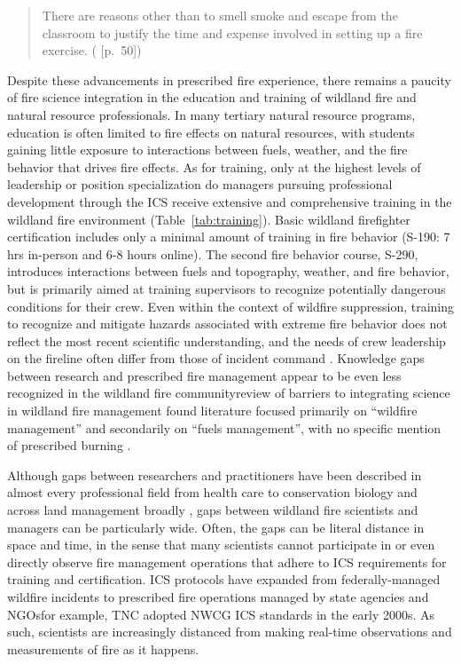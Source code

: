 \documentclass[fire,casereport,accept,moreauthors,pdftex]{Definitions/mdpi}  %
\begin{document}
\begin{quote}
There are reasons other than to smell smoke and escape from the classroom to justify the time and expense involved in setting up a fire exercise. (\cite{andrews1989} [p.~50])
\end{quote}

Despite these advancements in prescribed fire experience, there remains a paucity of fire science integration in the education and training of wildland fire and natural resource professionals.
In many tertiary natural resource programs, education is often limited to fire effects on natural resources, with students gaining little exposure to interactions between fuels, weather, and the fire behavior that drives fire effects.
As for training, only at the highest levels of leadership or position specialization do managers pursuing professional development through the ICS receive extensive and comprehensive training in the wildland fire environment (Table~\ref{tab:training}).
Basic wildland firefighter certification includes only a minimal amount of training in fire behavior (S-190: 7 hrs in-person and 6-8 hours online).
The second fire behavior course, S-290, introduces interactions between fuels and topography, weather, and fire behavior, but is primarily aimed at training supervisors to recognize potentially dangerous conditions for their crew.
Even within the context of wildfire suppression, training to recognize and mitigate hazards associated with extreme fire behavior does not reflect the most recent scientific understanding, and the needs of crew leadership on the fireline often differ from those of incident command \citep{werth2016}.
Knowledge gaps between research and prescribed fire management appear to be even less recognized in the wildland fire community\textemdash review of barriers to integrating  science in wildland fire management found literature focused primarily on ``wildfire management'' and secondarily on ``fuels management'', with no specific mention of prescribed burning \citep{hunter2020}.

Although gaps between researchers and practitioners have been described in almost every professional field from health care to conservation biology \citep{stott2012, prendergast1999} and across land management broadly \citep{carter2020}, gaps between wildland fire scientists and managers can be particularly wide.
Often, the gaps can be literal distance in space and time, in the sense that many scientists cannot participate in or even directly observe fire management operations that adhere to ICS requirements for training and certification.
ICS protocols have expanded from federally-managed wildfire incidents to prescribed fire operations managed by state agencies and NGOs\textemdash{}for example, TNC adopted NWCG ICS standards in the early 2000s.  
As such, scientists are increasingly distanced from making real-time observations and measurements of fire as it happens.
\end{document}
